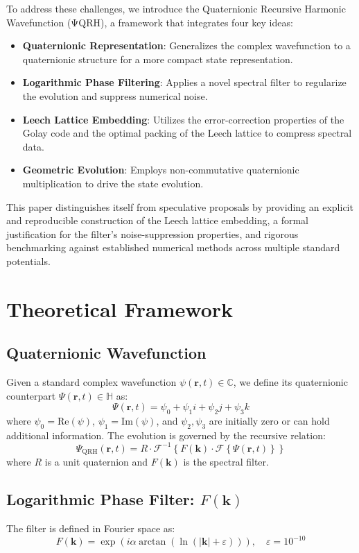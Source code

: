 \documentclass[12pt]{article}
\begin{document}
To address these challenges, we introduce the Quaternionic Recursive Harmonic Wavefunction (ΨQRH), a framework that integrates four key ideas:
\begin{itemize}
    \item \textbf{Quaternionic Representation}: Generalizes the complex wavefunction to a quaternionic structure for a more compact state representation.
    \item \textbf{Logarithmic Phase Filtering}: Applies a novel spectral filter to regularize the evolution and suppress numerical noise.
    \item \textbf{Leech Lattice Embedding}: Utilizes the error-correction properties of the Golay code and the optimal packing of the Leech lattice to compress spectral data.
    \item \textbf{Geometric Evolution}: Employs non-commutative quaternionic multiplication to drive the state evolution.
\end{itemize}

This paper distinguishes itself from speculative proposals by providing an explicit and reproducible construction of the Leech lattice embedding, a formal justification for the filter’s noise-suppression properties, and rigorous benchmarking against established numerical methods across multiple standard potentials.

\section{Theoretical Framework}
\subsection{Quaternionic Wavefunction}
Given a standard complex wavefunction $ \psi(\mathbf{r}, t) \in \mathbb{C} $, we define its quaternionic counterpart $ \Psi(\mathbf{r}, t) \in \mathbb{H} $ as:
\[
\Psi(\mathbf{r}, t) = \psi_0 + \psi_1 i + \psi_2 j + \psi_3 k
\]
where $ \psi_0 = \text{Re}(\psi) $, $ \psi_1 = \text{Im}(\psi) $, and $ \psi_2, \psi_3 $ are initially zero or can hold additional information. The evolution is governed by the recursive relation:
\[
\Psi_{\text{QRH}}(\mathbf{r}, t) = R \cdot \mathcal{F}^{-1} \left\{ F(\mathbf{k}) \cdot \mathcal{F} \left\{ \Psi(\mathbf{r}, t) \right\} \right\}
\]
where $ R $ is a unit quaternion and $ F(\mathbf{k}) $ is the spectral filter.

\subsection{Logarithmic Phase Filter: $ F(\mathbf{k}) $}
The filter is defined in Fourier space as:
\[
F(\mathbf{k}) = \exp\left( i \alpha \arctan\left( \ln (|\mathbf{k}| + \varepsilon) \right) \right), \quad \varepsilon = 10^{-10}
\]
\end{document}

